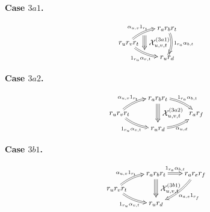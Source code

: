 \documentclass[a4paper, twoside, 11pt, english]{article}
\newcommand{\caseconfluence}[1]{%
\[
\scalebox{0.9}{$#1$}
\]
}
\begin{document}
\noindent
\begin{minipage}[t]{0.32\textwidth}
\centering
\textbf{Case $3a1$.}

\caseconfluence{
\xymatrix @R=0.75em @C=1.8em @!C {
        & r_a r_b r_t
         \ar@2@/^/[dd]^-{1_{r_a}\alpha_{b,t}}
\ar@3[]!<-30pt,-10pt>;[dd]!<-30pt,10pt>^-*+{\mathcal X^{(3a1)}_{u,v,t}}        
        \\
r_u r_v r_t
        \ar@2@/^/[ur]^-{\alpha_{u,v}1_{r_t}}
        \ar@2@/_/[dr]_-{1_{r_u}\alpha_{v,t}}
\\
        & r_u r_d
}
}
\end{minipage}
\hfill
\begin{minipage}[t]{0.32\textwidth}
\centering
\textbf{Case $3a2$.}

\caseconfluence{
\xymatrix @R=0.75em @C=1.8em @!C {
        & r_a r_b r_t
         \ar@2@/^/[dr]^-{1_{r_a}\alpha_{b,t}}
        \ar@3[]!<0pt,-8pt>;[dd]!<0pt,8pt>^-*+{\mathcal X^{(3a2)}_{u,v,t}}
        \\
r_u r_v r_t
        \ar@2@/^/[ur]^-{\alpha_{u,v}1_{r_t}}
        \ar@2@/_/[dr]_-{1_{r_u}\alpha_{v,t}}
  && r_a r_f
\\
        & r_u r_d
        \ar@2@/_/[ur]_-{\alpha_{u,d}}
}
}
\end{minipage}
\hfill
\begin{minipage}[t]{0.32\textwidth}
\centering
\textbf{Case $3b1$.}

\caseconfluence{
\xymatrix @R=0.75em @C=1.8em @!C {
        & r_a r_b r_t
        \ar@2[r]^-{1_{r_a}\alpha_{b,t}}
        \ar@3[]!<0pt,-8pt>;[dd]!<0pt,8pt>^-*+{\mathcal X^{(3b1)}_{u,v,t}}
        & r_a r_e r_f
          \ar@2@/^/[ddl]^-{\alpha_{a,e}1_{r_f}}
        \\
r_u r_v r_t
        \ar@2@/^/[ur]^-{\alpha_{u,v}1_{r_t}}
        \ar@2@/_/[dr]_-{1_{r_u}\alpha_{v,t}}
        \\
        & r_u r_d
}
}
\end{minipage}
\medskip
\end{document}
